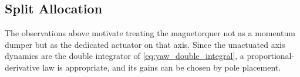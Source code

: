 


\subsection{Split Allocation}
\label{subsec:split_allocation}
The observations above motivate treating the magnetorquer not as a momentum dumper but as the dedicated actuator on that axis. Since the unactuated axis dynamics are the double integrator of \autoref{eq:yaw_double_integral}, a proportional-derivative law is appropriate, and its gains can be chosen by pole placement.

